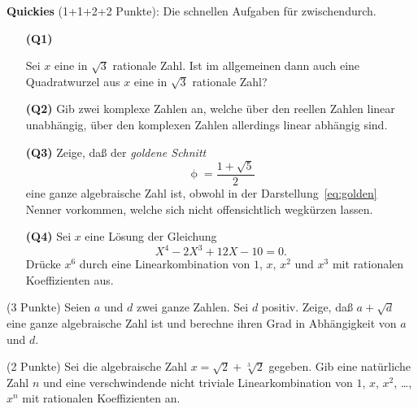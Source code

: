 \documentclass{algsheet}
\author{Dipl.-Math.~Franz Vogler}
\date{14.~Dezember 2010}
\begin{document}
                \maketitle





\begin{exercise}\textbf{Quickies} (1+1+2+2 Punkte): Die schnellen Aufgaben für zwischendurch.\newline

\begin{itemize}
 \item [\textbf{(Q1)}]
     
    Sei \(x\) eine in \(\sqrt 3\) rationale Zahl. Ist im allgemeinen dann auch
    eine Quadratwurzel aus \(x\) eine in \(\sqrt 3\) rationale Zahl?

\item [\textbf{(Q2)}]
         Gib zwei komplexe Zahlen an, welche über den reellen Zahlen linear unabhängig,
    über den komplexen Zahlen allerdings linear abhängig sind.
 
\item [\textbf{(Q3)}]
     Zeige, daß der \emph{goldene Schnitt}
    \begin{equation}
        \upphi = \frac{1 + \sqrt 5} 2
        \label{eq:golden}
    \end{equation}
    eine ganze algebraische Zahl ist, obwohl in der
    Darstellung~\eqref{eq:golden} Nenner vorkommen, welche sich nicht offensichtlich
    wegkürzen lassen.

\item [\textbf{(Q4)}]
       Sei \(x\) eine Lösung der Gleichung
    \[
        X^4 - 2 X^3 + 12 X - 10 = 0.
    \]
    Drücke \(x^6\) durch eine Linearkombination von
    \(1\), \(x\), \(x^2\) und \(x^3\) mit rationalen Koeffizienten aus.

\end{itemize}
\end{exercise}


\begin{exercise}(3 Punkte)\newline
    Seien \(a\) und \(d\) zwei ganze Zahlen. Sei \(d\) positiv. Zeige, daß
    \(a + \sqrt d\) eine ganze algebraische Zahl ist und berechne ihren
    Grad in Abhängigkeit von \(a\) und \(d\).
\end{exercise}



\begin{exercise}(2 Punkte)\newline
    Sei die algebraische Zahl \(x = \sqrt{2} + \sqrt[3] 2\) gegeben. Gib eine
    natürliche Zahl \(n\) und eine verschwindende 
    nicht triviale Linearkombination 
    von \(1\), \(x\), \(x^2\), \dots, \(x^n\) mit rationalen Koeffizienten an.
\end{exercise}
\end{document}
